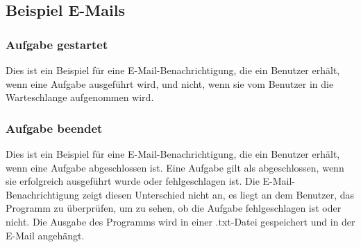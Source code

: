 \documentclass[a4paper,12pt]{article}
\begin{document}
\clearpage

\subsection {Beispiel E-Mails}
\subsubsection{Aufgabe gestartet}
Dies ist ein Beispiel für eine E-Mail-Benachrichtigung, die ein Benutzer erhält, wenn eine Aufgabe ausgeführt wird, und nicht, wenn sie vom Benutzer in die Warteschlange aufgenommen wird. \\
\begin{center}
\end{center}

\clearpage
\subsubsection{Aufgabe beendet}
Dies ist ein Beispiel für eine E-Mail-Benachrichtigung, die ein Benutzer erhält, wenn eine Aufgabe abgeschlossen ist. Eine Aufgabe gilt als abgeschlossen, wenn sie erfolgreich ausgeführt wurde oder fehlgeschlagen ist. Die E-Mail-Benachrichtigung zeigt diesen Unterschied nicht an, es liegt an dem Benutzer, das Programm zu überprüfen, um zu sehen, ob die Aufgabe fehlgeschlagen ist oder nicht. Die Ausgabe des Programms wird in einer .txt-Datei gespeichert und in der E-Mail angehängt. \\
\end{document}
